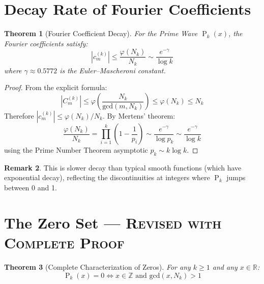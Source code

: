 ﻿\documentclass[12pt,a4paper]{report}
\theoremstyle{plain}
\newtheorem{theorem}{Theorem}[section]
\theoremstyle{definition}
\newtheorem{remark}[theorem]{Remark}
\newcommand{\R}{\mathbb{R}}
\newcommand{\Z}{\mathbb{Z}}
\renewcommand{\gcd}{\text{gcd}}
\renewcommand{\phi}{\varphi}
\DeclareMathOperator{\Pk}{P}
\begin{document}
\section{Decay Rate of Fourier Coefficients}

\begin{theorem}[Fourier Coefficient Decay]
\label{thm:fourier_decay}
For the Prime Wave $\Pk_k(x)$, the Fourier coefficients satisfy:
\[
\left|c_m^{(k)}\right| \leq \frac{\phi(N_k)}{N_k} \sim \frac{e^{-\gamma}}{\log k}
\]
where $\gamma \approx 0.5772$ is the Euler--Mascheroni constant.
\end{theorem}

\begin{proof}
From the explicit formula:
\[
\left|C_m^{(k)}\right| \leq \phi\left(\frac{N_k}{\gcd(m,N_k)}\right) \leq \phi(N_k) \leq N_k
\]
Therefore $|c_m^{(k)}| \leq \phi(N_k)/N_k$. By Mertens' theorem:
\[
\frac{\phi(N_k)}{N_k} = \prod_{i=1}^k \left(1 - \frac{1}{p_i}\right) \sim \frac{e^{-\gamma}}{\log p_k} \sim \frac{e^{-\gamma}}{\log k}
\]
using the Prime Number Theorem asymptotic $p_k \sim k \log k$.
\end{proof}

\begin{remark}
This is slower decay than typical smooth functions (which have exponential decay), reflecting the discontinuities at integers where $\Pk_k$ jumps between 0 and 1.
\end{remark}

\section{The Zero Set --- \textsc{Revised with Complete Proof}}

\begin{theorem}[Complete Characterization of Zeros]
\label{thm:zero_set}
For any $k \geq 1$ and any $x \in \R$:
\[
\Pk_k(x) = 0 \iff x \in \Z \text{ and } \gcd(x, N_k) > 1
\]
\end{theorem}
\end{document}
